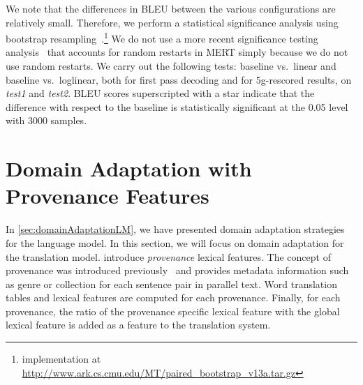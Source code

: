 We note that the differences in BLEU between the various configurations are
relatively small. Therefore, we perform a statistical significance analysis
using bootstrap resampling~\citep{koehn:2004:EMNLP}.\footnote{implementation at \url{http://www.ark.cs.cmu.edu/MT/paired_bootstrap_v13a.tar.gz}}
We do not use a more
recent significance testing analysis~\citep{clark-dyer-lavie-smith:2011:ACL} that
accounts for random restarts in MERT simply because we do not use
random restarts. %
We carry out the following tests: baseline vs.\ linear and baseline vs.\ loglinear, both
for first pass decoding and for 5g-rescored results, on \emph{test1} and \emph{test2}.
BLEU scores superscripted with a star indicate that the difference with respect to the
baseline is statistically significant at the 0.05 level with 3000 samples.


\section{Domain Adaptation with Provenance Features}
\label{sec:domainAdaptationGrammar}


In \autoref{sec:domainAdaptationLM}, we have presented domain adaptation strategies
for the language model. In this section, we will focus on domain
adaptation for the translation model.
\citet{chiang-deneefe-pust:2011:ACL} introduce \emph{provenance} lexical
features. The concept of provenance was introduced
previously~\citep{matsoukas-rosti-zhang:2009:EMNLP} and
provides metadata information such as genre or collection for each
sentence pair in parallel text.
%
%
Word translation tables and
lexical features are computed for each provenance. %
Finally, for each provenance, the ratio of the provenance specific
lexical feature with the global lexical feature is added as a feature
to the translation system.

